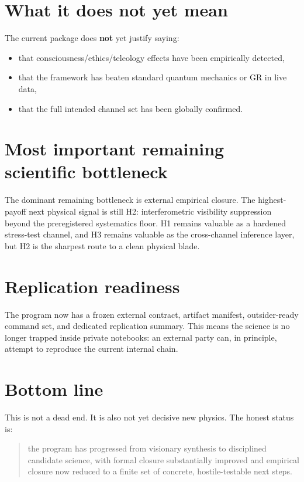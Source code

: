 \documentclass[11pt]{article}
\begin{document}
\section{What it does not yet mean}
The current package does \textbf{not} yet justify saying:
\begin{itemize}
    \item that consciousness/ethics/teleology effects have been empirically detected,
    \item that the framework has beaten standard quantum mechanics or GR in live data,
    \item that the full intended channel set has been globally confirmed.
\end{itemize}

\section{Most important remaining scientific bottleneck}
The dominant remaining bottleneck is external empirical closure. The highest-payoff next physical signal is still H2: interferometric visibility suppression beyond the preregistered systematics floor. H1 remains valuable as a hardened stress-test channel, and H3 remains valuable as the cross-channel inference layer, but H2 is the sharpest route to a clean physical blade.

\section{Replication readiness}
The program now has a frozen external contract, artifact manifest, outsider-ready command set, and dedicated replication summary. This means the science is no longer trapped inside private notebooks: an external party can, in principle, attempt to reproduce the current internal chain.

\section{Bottom line}
This is not a dead end. It is also not yet decisive new physics. The honest status is:
\begin{quote}
the program has progressed from visionary synthesis to disciplined candidate science, with formal closure substantially improved and empirical closure now reduced to a finite set of concrete, hostile-testable next steps.
\end{quote}
\end{document}
